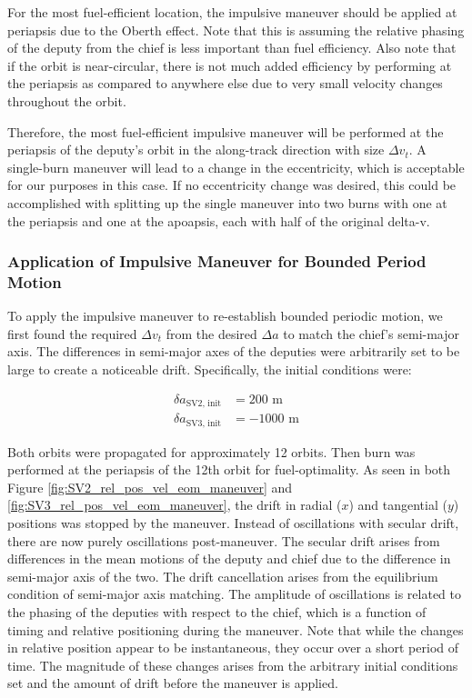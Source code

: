 For the most fuel-efficient location, the impulsive maneuver should be applied at periapsis due to the Oberth effect. Note that this is assuming the relative phasing of the deputy from the chief is less important than fuel efficiency. Also note that if the orbit is near-circular, there is not much added efficiency by performing at the periapsis as compared to anywhere else due to very small velocity changes throughout the orbit.

Therefore, the most fuel-efficient impulsive maneuver will be performed at the periapsis of the deputy's orbit in the along-track direction with size $\Delta v_t$. A single-burn maneuver will lead to a change in the eccentricity, which is acceptable for our purposes in this case. If no eccentricity change was desired, this could be accomplished with splitting up the single maneuver into two burns with one at the periapsis and one at the apoapsis, each with half of the original delta-v. 

\subsubsection{Application of Impulsive Maneuver for Bounded Period Motion}
To apply the impulsive maneuver to re-establish bounded periodic motion, we first found the required $\Delta v_t$ from the desired $\Delta a$ to match the chief's semi-major axis. The differences in semi-major axes of the deputies were arbitrarily set to be large to create a noticeable drift. Specifically, the initial conditions were:

\begin{align*}
\delta a_{\text{SV2, init}} &= 200 \text{ m} \\
\delta a_{\text{SV3, init}}  &= -1000 \text{ m}
\end{align*}

Both orbits were propagated for approximately 12 orbits. Then burn was performed at the periapsis of the 12th orbit for fuel-optimality. As seen in both Figure \ref{fig:SV2_rel_pos_vel_eom_maneuver} and \ref{fig:SV3_rel_pos_vel_eom_maneuver}, the drift in radial ($x$) and tangential ($y$) positions was stopped by the maneuver. Instead of oscillations with secular drift, there are now purely oscillations post-maneuver. The secular drift arises from differences in the mean motions of the deputy and chief due to the difference in semi-major axis of the two. The drift cancellation arises from the equilibrium condition of semi-major axis matching. The amplitude of oscillations is related to the phasing of the deputies with respect to the chief, which is a function of timing and relative positioning during the maneuver. Note that while the changes in relative position appear to be instantaneous, they occur over a short period of time. The magnitude of these changes arises from the arbitrary initial conditions set and the amount of drift before the maneuver is applied. 


